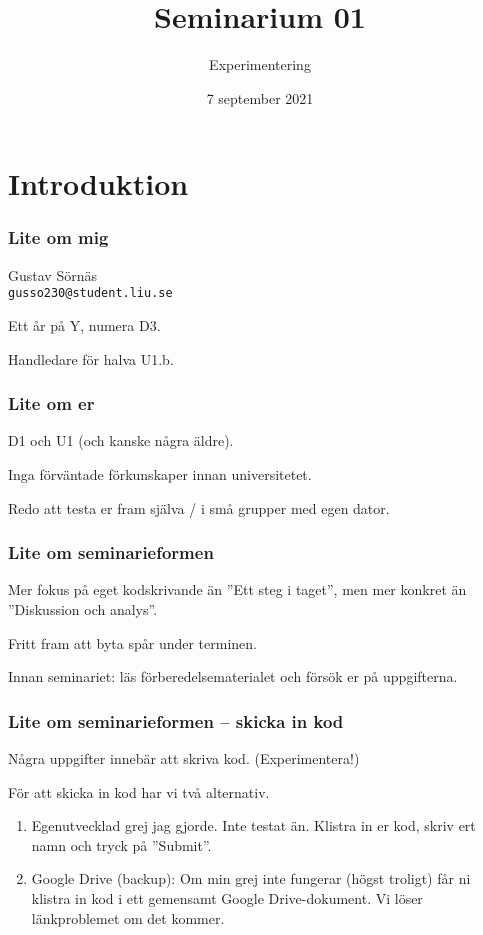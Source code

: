 \documentclass{beamer}
\title{Seminarium 01}
\subtitle{Experimentering}
\date{7 september 2021}
\begin{document}
  \frame{\titlepage}

  \section*{Introduktion}

  \begin{frame}
    \frametitle{Lite om mig}

    Gustav Sörnäs \\
    \texttt{gusso230@student.liu.se}

    Ett år på Y, numera D3.

    Handledare för halva U1.b.

  \end{frame}

  \begin{frame}
    \frametitle{Lite om er}

    D1 och U1 (och kanske några äldre).

    Inga förväntade förkunskaper innan universitetet.

    Redo att testa er fram själva / i små grupper med egen dator.

  \end{frame}

  \begin{frame}
    \frametitle{Lite om seminarieformen}

    Mer fokus på eget kodskrivande än ''Ett steg i taget'', men mer konkret än
    ''Diskussion och analys''.

    Fritt fram att byta spår under terminen.

    Innan seminariet: läs förberedelsematerialet och försök er på uppgifterna.

  \end{frame}

  \begin{frame}
    \frametitle{Lite om seminarieformen -- skicka in kod}

    Några uppgifter innebär att skriva kod. (Experimentera!)

    För att skicka in kod har vi två alternativ.

    \begin{enumerate}

      \item Egenutvecklad grej jag gjorde. Inte testat än. Klistra in er kod,
      skriv ert namn och tryck på ''Submit''.

      \item Google Drive (backup): Om min grej inte fungerar (högst troligt) får
      ni klistra in kod i ett gemensamt Google Drive-dokument. Vi löser
      länkproblemet om det kommer.

    \end{enumerate}

  \end{frame}
\end{document}
